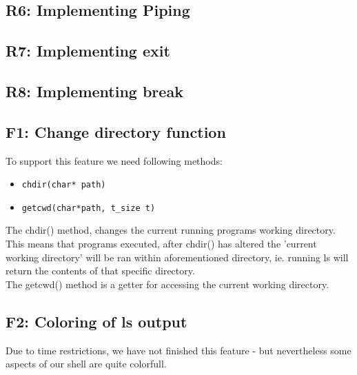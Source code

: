 \subsection{R6: Implementing Piping}

\subsection{R7: Implementing exit}

\subsection{R8: Implementing break}

\subsection{F1: Change directory function}
To support this feature we need following methods:
\begin{itemize}
\item \begin{verbatim}chdir(char* path)
\end{verbatim}
\item \begin{verbatim}getcwd(char*path, t_size t)
\end{verbatim}
\end{itemize}

The chdir() method, changes the current running programs working directory. This means that programs executed, after chdir() has altered the 'current working directory' will be ran within aforementioned directory, ie. running ls will return the contents of that specific directory.\\

The getcwd() method is a getter for accessing the current working directory.

\subsection{F2: Coloring of ls output}
Due to time restrictions, we have not finished this feature - but nevertheless some aspects of our  shell are quite colorfull.